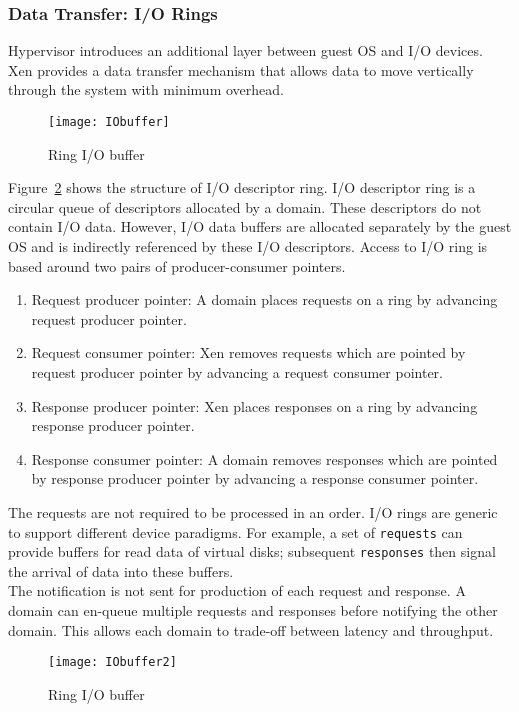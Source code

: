 \subsubsection*{Data Transfer: I/O Rings}
\label{subsec:io rings}
Hypervisor introduces an additional layer between guest OS and I/O devices. Xen provides a data transfer mechanism that allows data to move vertically through the system with minimum overhead. 
\begin{figure}[!ht]
\centering
\texttt{[image: IObuffer]}
\caption{Ring I/O buffer}
\label{fig:Ring buffer}
\end{figure}
Figure~\ref{fig:Ring buffer} shows the structure of I/O descriptor ring. I/O descriptor ring is a circular queue of descriptors allocated by a domain. These descriptors do not contain I/O data. However, I/O data buffers are allocated separately by the guest OS and is indirectly referenced by these I/O descriptors. Access to I/O ring is based around two pairs of producer-consumer pointers.
\begin{enumerate}
\item Request producer pointer: A domain places requests on a ring by advancing request producer pointer. 
\item Request consumer pointer: Xen removes requests which are pointed by request producer pointer by advancing a request consumer pointer. 
\item Response producer pointer: Xen places responses on a ring by advancing response producer pointer. 
\item Response consumer pointer: A domain removes responses which are pointed by response producer pointer by advancing a response consumer pointer. 
\end{enumerate} 
The requests are not required to be processed in an order. I/O rings are generic to support different device paradigms. For example, a set of \texttt{requests} can provide buffers for read data of virtual disks; subsequent \texttt{responses} then signal the arrival of data into these buffers. 
\\[3mm]
The notification is not sent for production of each request and response. A domain can en-queue multiple requests and responses before notifying the other domain. This allows each domain to trade-off between latency and throughput.
\begin{figure}[!ht]
\centering
\texttt{[image: IObuffer2]}
\caption{Ring I/O buffer}
\label{fig:Ring buffer}
\end{figure}

